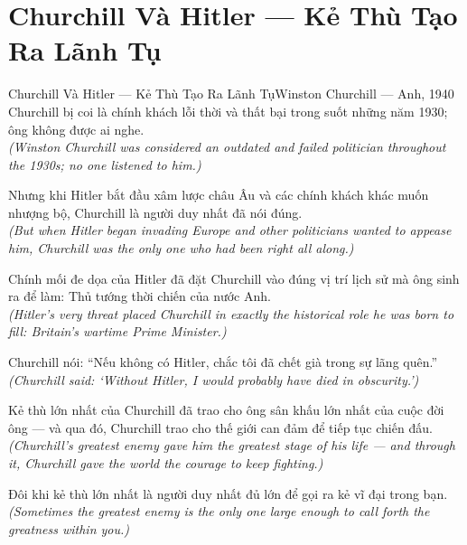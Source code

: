 \section{Churchill Và Hitler --- Kẻ Thù Tạo Ra Lãnh Tụ}
\begin{truyen}{Churchill Và Hitler --- Kẻ Thù Tạo Ra Lãnh Tụ}{Winston Churchill --- Anh, 1940}
 Churchill bị coi là chính khách lỗi thời và thất bại trong suốt những năm 1930; ông không được ai nghe.\\[4pt]
\textit{(Winston Churchill was considered an outdated and failed politician throughout the 1930s; no one listened to him.)}

Nhưng khi Hitler bắt đầu xâm lược châu Âu và các chính khách khác muốn nhượng bộ, Churchill là người duy nhất đã nói đúng.\\[4pt]
\textit{(But when Hitler began invading Europe and other politicians wanted to appease him, Churchill was the only one who had been right all along.)}

Chính mối đe dọa của Hitler đã đặt Churchill vào đúng vị trí lịch sử mà ông sinh ra để làm: Thủ tướng thời chiến của nước Anh.\\[4pt]
\textit{(Hitler's very threat placed Churchill in exactly the historical role he was born to fill: Britain's wartime Prime Minister.)}

Churchill nói: ``Nếu không có Hitler, chắc tôi đã chết già trong sự lãng quên.''\\[4pt]
\textit{(Churchill said: `Without Hitler, I would probably have died in obscurity.')}

Kẻ thù lớn nhất của Churchill đã trao cho ông sân khấu lớn nhất của cuộc đời ông --- và qua đó, Churchill trao cho thế giới can đảm để tiếp tục chiến đấu.\\[4pt]
\textit{(Churchill's greatest enemy gave him the greatest stage of his life --- and through it, Churchill gave the world the courage to keep fighting.)}

\end{truyen}
\begin{baihoc}
  Đôi khi kẻ thù lớn nhất là người duy nhất đủ lớn để gọi ra kẻ vĩ đại trong bạn.\\[4pt]
  \textit{(Sometimes the greatest enemy is the only one large enough to call forth the greatness within you.)}
\end{baihoc}

